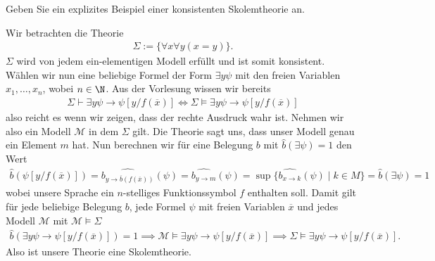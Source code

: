 
\begin{exercise}[144]
Geben Sie ein explizites Beispiel einer konsistenten Skolemtheorie an.
\end{exercise}


\begin{solution}
	Wir betrachten die Theorie
	\begin{align*}
	\Sigma := \{\forall x \forall y (x = y)\}.
	\end{align*}
	$\Sigma$ wird von jedem ein-elementigen Modell erfüllt und ist somit konsistent.
	Wählen wir nun eine beliebige Formel der Form $\exists y \psi$
	mit den freien Variablen $x_1, \dots, x_n$, wobei $n \in \N$.
	Aus der Vorlesung wissen wir bereits
	\begin{align*}
	\Sigma \vdash \exists y \psi \rightarrow \psi[y/f(\overline{x})] \Leftrightarrow \Sigma \vDash \exists y \psi \rightarrow \psi[y/f(\overline{x})]
	\end{align*}
	also reicht es wenn wir zeigen, dass der rechte Ausdruck wahr ist. Nehmen wir also ein Modell $\mathscr{M}$ in dem $\Sigma$ gilt. Die Theorie sagt uns, dass unser Modell genau ein Element $m$ hat. Nun berechnen wir für eine Belegung $b$ mit $\widehat{b}(\exists \psi) = 1$ den Wert
	\begin{align*}
	\widehat b(\psi[y/f(\overline{x})]) = \widehat{b_{y \to \overline{b}(f(\overline{x}))}}(\psi) = \widehat{b_{y \to m}}(\psi) = \sup\{\widehat{b_{x \to k}}(\psi) \mid k \in M\} = \widehat{b}(\exists \psi) = 1
	\end{align*}
	wobei unsere Sprache ein $n$-stelliges Funktionssymbol $f$ enthalten soll.
	Damit gilt für jede beliebige Belegung $b$, jede Formel $\psi$ mit freien Variablen
	$\overline{x}$ und jedes Modell $\mathscr{M}$ mit $\mathscr{M} \vDash \Sigma$
	\begin{align*}
		\hat{b}(\exists y \psi \rightarrow \psi[y/f(\overline{x})]) = 1
		\implies \mathscr{M} \vDash \exists y \psi \rightarrow \psi[y/f(\overline{x})]
		\implies \Sigma \vDash \exists y \psi \rightarrow \psi[y/f(\overline{x})].
	\end{align*}
	Also ist unsere Theorie eine Skolemtheorie.
\end{solution}

